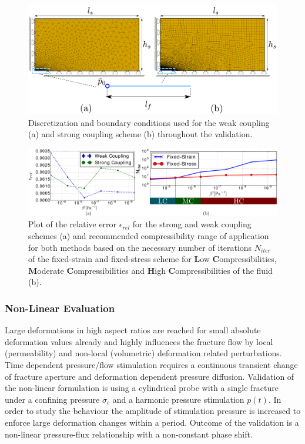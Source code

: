 \begin{figure}[!ht]
\centering
\includegraphics[width=1\linewidth]{figures/ME9_benchmark_set_up.pdf}
\caption{Discretization and boundary conditions used for the weak coupling (a) and strong coupling scheme
(b) throughout the validation.}
\label{fig:ME9_validation_set_up}
\end{figure}
\begin{figure}
\centering
\includegraphics[width=1\linewidth]{figures/ME9_compressibility_study.pdf}
\caption{Plot of the relative error $\epsilon_{rel}$ for the strong and weak coupling schemes (a) and recommended compressibility range of application for both methods based on the necessary number of iterations $N_{iter}$ of the fixed-strain and fixed-stress scheme for \textbf{L}ow \textbf{C}ompressibilities, \textbf{M}oderate \textbf{C}ompressibilities and \textbf{H}igh \textbf{C}ompressibilities of the fluid (b).}
\label{fig:ME9_validation_compressibility}
\end{figure}

\subsubsection*{Non-Linear Evaluation}
Large deformations in high aspect ratios are reached for small absolute deformation values already and highly influences the fracture flow by local (permeability) and non-local (volumetric) deformation related perturbations. Time dependent pressure/flow stimulation requires a continuous transient change of fracture aperture and deformation dependent pressure diffusion. Validation of the non-linear formulation is using a cylindrical probe with a single fracture under a confining pressure $\sigma_c$ and a harmonic pressure stimulation $p(t)$. In order to study the behaviour the amplitude of stimulation pressure is increased to enforce large deformation changes within a period. Outcome of the validation is a non-linear pressure-flux relationship with a non-constant phase shift.

